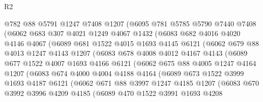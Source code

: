 \begin{lexlean}{R2}
\begin{coremodule}
          @782
          @88
          @5791
          @1247
          @7408
          @1207
          (@6095
            @781
            @5785
            @5790
            @7440
            @7408
            (@6062
              @683
              @307
              @4021
              @1249
              @4067
              @1432
              (@6083
                @682
                @4016
                @4020
                @4146
                @4067
                (@6089
                  @681
                  @1522
                  @4015
                  @1693
                  @4145
                  @6121
                  (@6062
                    @679
                    @88
                    @4013
                    @1247
                    @4143
                    @1207
                    (@6083
                      @678
                      @4008
                      @4012
                      @4167
                      @4143
                      (@6089
                        @677
                        @1522
                        @4007
                        @1693
                        @4166
                        @6121
                        (@6062
                          @675
                          @88
                          @4005
                          @1247
                          @4164
                          @1207
                          (@6083
                            @674
                            @4000
                            @4004
                            @4188
                            @4164
                            (@6089
                              @673
                              @1522
                              @3999
                              @1693
                              @4187
                              @6121
                              (@6062
                                @671
                                @88
                                @3997
                                @1247
                                @4185
                                @1207
                                (@6083
                                  @670
                                  @3992
                                  @3996
                                  @4209
                                  @4185
                                  (@6089
                                    @470
                                    @1522
                                    @3991
                                    @1693
                                    @4208

\end{coremodule}
\end{lexlean}
